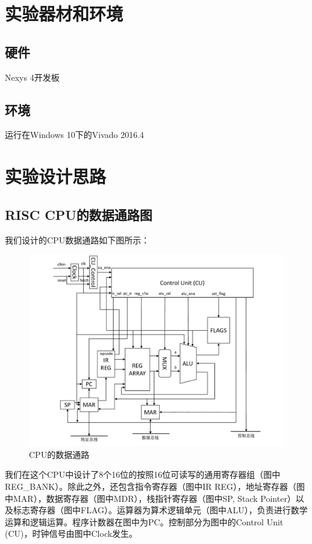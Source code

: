 \documentclass[titlepage, 11pt]{article}
\begin{document}
	\section{实验器材和环境}
	\subsection{硬件}
	Nexys 4开发板
	\subsection{环境}
	运行在Windows 10下的Vivado 2016.4
	\section{实验设计思路}
	\subsection{RISC CPU的数据通路图}
	我们设计的CPU数据通路如下图所示：
	\begin{figure}[htb]
		\centering
		\includegraphics[scale=0.7]{3.pdf}
		\caption{CPU的数据通路}
	\end{figure}\par 
	我们在这个CPU中设计了8个16位的按照16位可读写的通用寄存器组（图中REG\_BANK）。除此之外，还包含指令寄存器（图中IR REG），地址寄存器（图中MAR），数据寄存器（图中MDR），栈指针寄存器（图中SP, Stack Pointer）以及标志寄存器（图中FLAG）。运算器为算术逻辑单元（图中ALU），负责进行数学运算和逻辑运算。程序计数器在图中为PC。控制部分为图中的Control Unit (CU)，时钟信号由图中Clock发生。
\end{document}
